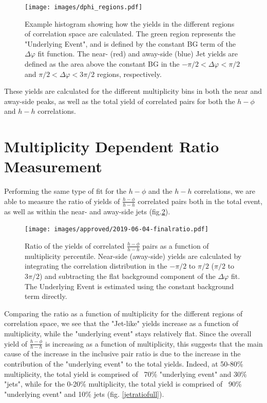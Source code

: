 \documentclass[ALICE,manyauthors]{ALICE_analysis_notes}
\begin{document}
\begin{itemize}
\begin{figure}[ht]
\centering
\texttt{[image: images/dphi\_regions.pdf]}
\caption{Example histogram showing how the yields in the different regions of correlation space are calculated.  The green region represents the "Underlying Event", and is defined by the constant BG term of the $\Delta\varphi$ fit function.  The near- (red) and away-side (blue) Jet yields are defined as the area above the constant BG in the $-\pi/2 < \Delta\varphi < \pi/2$ and $\pi/2 < \Delta\varphi < 3\pi/2$ regions, respectively.}
\label{regions}
\end{figure}

These yields are calculated for the different multiplicity bins in both the near and away-side peaks, as well as the total yield of correlated pairs for both the $h-\phi$ and $h-h$ correlations.


\section{Multiplicity Dependent Ratio Measurement}

Performing the same type of fit for the $h-\phi$ and the $h-h$ correlations, we are able to measure the ratio of yields of $\frac{h-\phi}{h-h}$ correlated pairs both in the total event, as well as within the near- and away-side jets (fig.\ref{ratioplot}).

\begin{figure}[ht]
\centering
\texttt{[image: images/approved/2019-06-04-finalratio.pdf]}
\caption{Ratio of the yields of correlated $\frac{h-\phi}{h-h}$ pairs as a function of multiplicity percentile.  Near-side (away-side) yields are calculated by integrating the correlation distribution in the $-\pi/2$ to $\pi/2$ ($\pi/2$ to $3\pi/2$) and subtracting the flat background component of the $\Delta\varphi$ fit. The Underlying Event is estimated using the constant background term directly.}
\label{ratioplot}
\end{figure}

Comparing the ratio as a function of multiplicity for the different regions of correlation space, we see that the "Jet-like" yields increase as a function of multiplicity, while the "underlying event" stays relatively flat.  Since the overall yield of $\frac{h-\phi}{h-h}$ is increasing as a function of multiplicity, this suggests that the main cause of the increase in the inclusive pair ratio is due to the increase in the contribution of the "underlying event" to the total yields.  Indeed, at 50-80\% multiplicity, the total yield is comprised of ~70\% "underlying event" and 30\% "jets", while for the 0-20\% multiplicity, the total yield is comprised of ~90\% "underlying event" and 10\% jets (fig. \ref{jetratiofull}).


\end{itemize}
\end{document}
